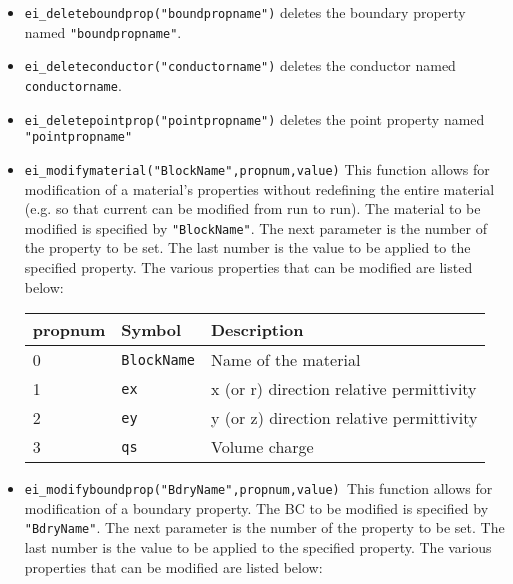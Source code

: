 \begin{itemize}
\item \texttt{ei\_deleteboundprop("boundpropname")} deletes the boundary property
named \texttt{"boundpropname"}.

\item \texttt{ei\_deleteconductor("conductorname")} deletes the conductor named
\texttt{conductorname}.

\item \texttt{ei\_deletepointprop("pointpropname")} deletes the point property named
\texttt{"pointpropname"}

\item \texttt{ei\_modifymaterial("BlockName",propnum,value)} This function allows for
modification of a material's properties without redefining the
entire material (e.g. so that current can be modified from run to
run). The material to be modified is specified by
\texttt{"BlockName"}. The next parameter is the number of the
property to be set. The last number is the value to be applied to
the specified property. The various properties that can be modified
are listed below:

\begin{tabular}{lll}
propnum & Symbol &  Description \\ \hline
 0 & \texttt{BlockName} & Name of the material \\
 1 & \texttt{ex} & x (or r) direction relative permittivity \\
 2 & \texttt{ey} & y (or z) direction relative permittivity \\
 3 & \texttt{qs} & Volume charge
\end{tabular}


\item \texttt{ei\_modifyboundprop("BdryName",propnum,value) }This function allows for
modification of a boundary property. The BC to be modified is specified by
\texttt{"BdryName"}. The next parameter is the number of the property to be
set. The last number is the value to be applied to the specified property.
The various properties that can be modified are listed below:


\end{itemize}
